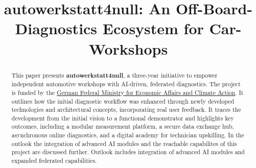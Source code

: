 




\title{autowerkstatt4null: An Off-Board-Diagnostics Ecosystem for Car-Workshops}
\author{%
}

\maketitle

\pagestyle{fancy}
\renewcommand{\headrulewidth}{0pt}
\renewcommand{\footrulewidth}{0.4pt}
\fancyhf{}

\fancyfoot[R]{\thepage}

\begin{abstract}
This paper presents \textbf{autowerkstatt4null}, a three-year initiative to empower independent automotive workshops with AI-driven, federated diagnostics. 
The project is funded by the \href{https://www.bundeswirtschaftsministerium.de/Navigation/EN/Home/home.html}{German Federal Ministry for Economic Affairs and Climate Action}. 
It outlines how the initial diagnostic workflow was enhanced through newly developed technologies and architectural concepts, incorporating real user feedback. 
It traces the development from the initial vision to a functional demonstrator and highlights key outcomes, including a modular measurement platform, 
a secure data exchange hub, asynchronous online diagnostics, and a digital academy for technician upskilling.
In the outlook the integration of advanced AI modules and the reachable capabilites of this project are discussed further.
Outlook includes integration of advanced AI modules and expanded federated capabilities.
\end{abstract}

